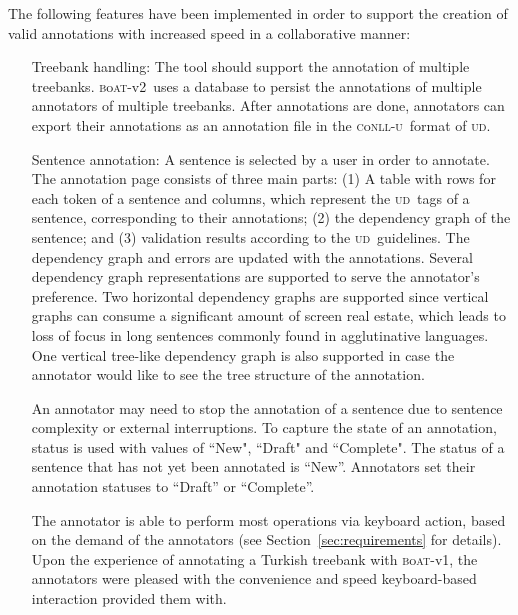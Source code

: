 \documentclass{elektr}
\newcommand{\conllu}{\textsc{c}o\textsc{nll-u}}
\newcommand{\boatvone}{\textsc{b}o\textsc{at}-{\scriptsize v1}}
\newcommand{\boatvtwo}{\textsc{b}o\textsc{at}-{\scriptsize v2}}
\newcommand{\ud}{\textsc{ud}}
\begin{document}
The following features have been implemented in order to support the creation of valid annotations with increased speed in a collaborative manner:
\begin{itemize}[before=\normalfont, font=\itshape, align=left,noitemsep,topsep=0pt,parsep=3pt,partopsep=0pt,labelsep=3pt,align=left]
    \item[Treebank handling:]
        The tool should support the annotation of multiple treebanks.
        \boatvtwo\ uses a database to persist the annotations of multiple annotators of multiple treebanks.
        After annotations are done, annotators can export their annotations as an annotation file in the \conllu\ format of \ud.

    \item[Sentence annotation:]
    	A sentence is selected by a user in order to annotate.
        The annotation page consists of three main parts: (1) A table with rows for each token of a sentence and columns, which represent the \ud\ tags of a sentence, corresponding to their annotations; (2) the dependency graph of the sentence; and (3) validation results according to the \ud\ guidelines.
        The dependency graph and errors are updated with the annotations.
        Several dependency graph representations are supported to serve the annotator's preference.
        Two horizontal dependency graphs are supported since vertical graphs can consume a significant amount of screen real estate, which leads to loss of focus in long sentences commonly found in agglutinative languages.
        One vertical tree-like dependency graph is also supported in case the annotator would like to see the tree structure of the annotation.

        An annotator may need to stop the annotation of a sentence due to sentence complexity or external interruptions.
        To capture the state of an annotation, status is used with values of ``New", ``Draft" and ``Complete".
        The status of a sentence that has not yet been annotated is ``New''.
	    Annotators set their annotation statuses to ``Draft'' or ``Complete''.

        The annotator is able to perform most operations via keyboard action, based on the demand of the annotators (see Section~\ref{sec:requirements} for details).
        Upon the experience of annotating a Turkish treebank with \boatvone, the annotators were pleased with the convenience and speed keyboard-based interaction provided them with.


\end{itemize}
\end{document}
